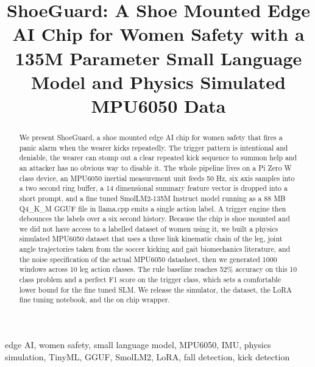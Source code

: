 \documentclass[conference]{IEEEtran}
\begin{document}
\title{ShoeGuard: A Shoe Mounted Edge AI Chip for Women Safety with a 135M Parameter Small Language Model and Physics Simulated MPU6050 Data}

\author{
\and
{}
\IEEEauthorblockA{}
\and
{}
\IEEEauthorblockA{}
\and
{}
\IEEEauthorblockA{}
}

\maketitle

\begin{abstract}
We present ShoeGuard, a shoe mounted edge AI chip for women safety that fires a panic alarm when the wearer kicks repeatedly. The trigger pattern is intentional and deniable, the wearer can stomp out a clear repeated kick sequence to summon help and an attacker has no obvious way to disable it. The whole pipeline lives on a Pi Zero W class device, an MPU6050 inertial measurement unit feeds 50 Hz, six axis samples into a two second ring buffer, a 14 dimensional summary feature vector is dropped into a short prompt, and a fine tuned SmolLM2-135M Instruct model running as a 88 MB Q4\_K\_M GGUF file in llama.cpp emits a single action label. A trigger engine then debounces the labels over a six second history. Because the chip is shoe mounted and we did not have access to a labelled dataset of women using it, we built a physics simulated MPU6050 dataset that uses a three link kinematic chain of the leg, joint angle trajectories taken from the soccer kicking and gait biomechanics literature, and the noise specification of the actual MPU6050 datasheet, then we generated 1000 windows across 10 leg action classes. The rule baseline reaches 52\% accuracy on this 10 class problem and a perfect F1 score on the trigger class, which sets a comfortable lower bound for the fine tuned SLM. We release the simulator, the dataset, the LoRA fine tuning notebook, and the on chip wrapper.
\end{abstract}

\begin{IEEEkeywords}
edge AI, women safety, small language model, MPU6050, IMU, physics simulation, TinyML, GGUF, SmolLM2, LoRA, fall detection, kick detection
\end{IEEEkeywords}
\end{document}
